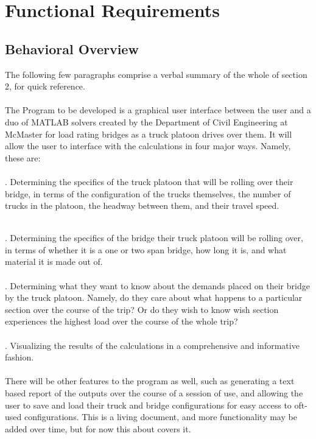 \documentclass[12pt]{article}
\begin{document}
\section{Functional Requirements}
\subsection{Behavioral Overview}
The following few paragraphs comprise a verbal summary of the whole of section 2, for quick reference.\\\\

\noindent The Program to be developed is a graphical user interface between the user and a duo of MATLAB solvers created by the Department of Civil Engineering at McMaster
for load rating bridges as a truck platoon drives over them. It will allow the user to interface with the calculations in four major ways. Namely, these are:\\\\ 

. Determining the specifics of the truck platoon that will be rolling over their bridge, in terms of the configuration of the trucks themselves, the number of trucks in
the platoon, the headway between them, and their travel speed.\\\

. Determining the specifics of the bridge their truck platoon will be rolling over, in terms of whether it is a one or two span bridge, how long it is, and what 
material it is made out of.\\\\

. Determining what they want to know about the demands placed on their bridge by the truck platoon. Namely, do they care about what happens to a particular section 
over the course of the trip? Or do they wish to know wish section experiences the highest load over the course of the whole trip?\\\\

. Visualizing the results of the calculations in a comprehensive and informative fashion.\\\\

\noindent There will be other features to the program as well, such as generating a text based report of the outputs over the course of a session of use, and allowing the user
to save and load their truck and bridge configurations for easy access to oft-used configurations. This is a living document, and more functionality may be added over time,
but for now this about covers it.
\end{document}
